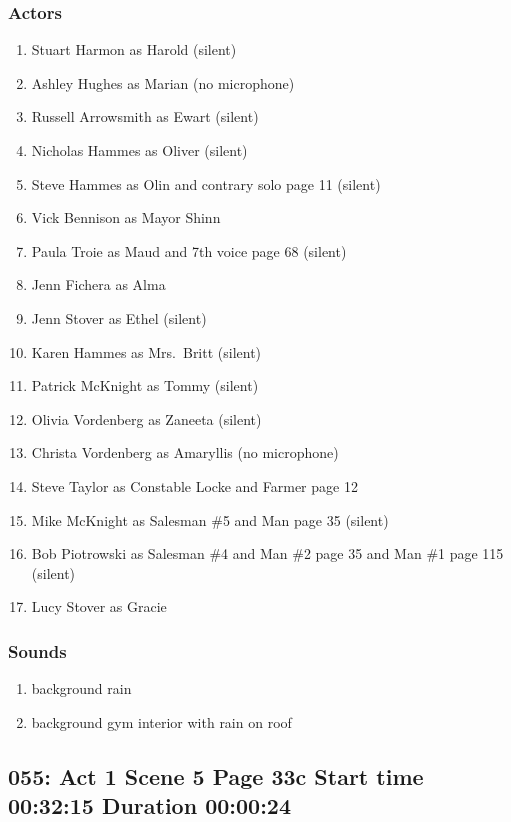 \subsubsection{Actors}
\begin{enumerate}
\item Stuart Harmon as Harold (silent)
\item Ashley Hughes as Marian (no microphone)
\item Russell Arrowsmith as Ewart (silent)
\item Nicholas Hammes as Oliver (silent)
\item Steve Hammes as Olin and contrary solo page 11 (silent)
\item Vick Bennison as Mayor Shinn
\item Paula Troie as Maud and 7th voice page 68 (silent)
\item Jenn Fichera as Alma
\item Jenn Stover as Ethel (silent)
\item Karen Hammes as Mrs.~Britt (silent)
\item Patrick McKnight as Tommy (silent)
\item Olivia Vordenberg as Zaneeta (silent)
\item Christa Vordenberg as Amaryllis (no microphone)
\item Steve Taylor as Constable Locke and Farmer page 12
\item Mike McKnight as Salesman \#5 and Man page 35 (silent)
\item Bob Piotrowski as Salesman \#4 and Man \#2 page 35 and Man \#1 page 115 (silent)
\item Lucy Stover as Gracie
\end{enumerate}

\subsubsection{Sounds}
\begin{enumerate}
\item background rain
\item background gym interior with rain on roof
\end{enumerate}
\subsection{055: Act 1 Scene 5 Page 33c Start time 00:32:15 Duration 00:00:24}

